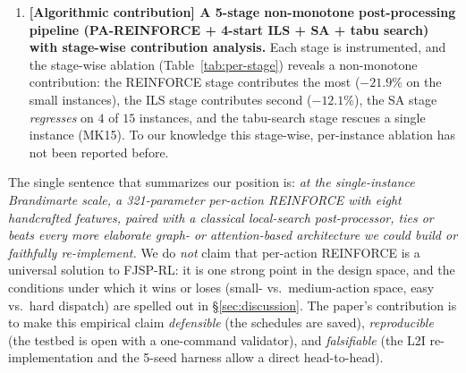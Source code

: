 \documentclass[10pt]{article}
\theoremstyle{definition}
\begin{document}
\begin{enumerate}
      beats a $\sim$110K-parameter graph-pointer
      network \citep{Lei2022}, a
      $\sim$180K-parameter heterogeneous graph
      Transformer \citep{Yang2024}, and a
      $\sim$32K-parameter heterogeneous graph
      Transformer \citep{Hu2020HGT} on the same
      benchmark. The takeaway is that the
      community's focus on the
      \emph{encoder} axis has run ahead of the
      evidence: at the single-instance scale
      considered here, the encoder is not the
      bottleneck, and a tiny linear-feature
      policy is the strongest single agent.
\item \textbf{[Algorithmic contribution]
      A 5-stage non-monotone post-processing
      pipeline (PA-REINFORCE + 4-start ILS + SA
      + tabu search) with stage-wise
      contribution analysis.} Each stage is
      instrumented, and the stage-wise ablation
      (Table~\ref{tab:per-stage}) reveals a
      non-monotone contribution: the
      REINFORCE stage contributes the most
      ($-21.9\%$ on the small instances), the
      ILS stage contributes second ($-12.1\%$),
      the SA stage \emph{regresses} on $4$ of
      $15$ instances, and the tabu-search
      stage rescues a single instance (MK15).
      To our knowledge this stage-wise,
      per-instance ablation has not been
      reported before.
\end{enumerate}

The single sentence that summarizes our position
is: \emph{at the single-instance Brandimarte
scale, a 321-parameter per-action REINFORCE with
eight handcrafted features, paired with a
classical local-search post-processor, ties or
beats every more elaborate graph- or
attention-based architecture we could build or
faithfully re-implement.} We do \emph{not} claim
that per-action REINFORCE is a universal solution
to FJSP-RL: it is one strong point in the
design space, and the conditions under which it
wins or loses (small- vs.\ medium-action space,
easy vs.\ hard dispatch) are spelled out in
\S\ref{sec:discussion}. The paper's
contribution is to make this empirical claim
\emph{defensible} (the schedules are saved),
\emph{reproducible} (the testbed is open with
a one-command validator), and
\emph{falsifiable} (the L2I re-implementation
and the 5-seed harness allow a direct
head-to-head).
\end{document}
